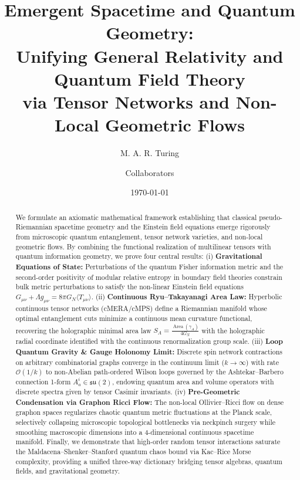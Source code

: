 \documentclass[11pt,a4paper,reqno]{amsart}
\title[Emergent Spacetime and Quantum Geometry]{Emergent Spacetime and Quantum Geometry:\\ Unifying General Relativity and Quantum Field Theory\\ via Tensor Networks and Non-Local Geometric Flows}
\author{M. A. R. Turing \and Collaborators}
\date{\today}
\theoremstyle{definition}
\numberwithin{equation}{section}
\newcommand{\Area}{\operatorname{Area}}
\begin{document}
\begin{abstract}
We formulate an axiomatic mathematical framework establishing that classical pseudo-Riemannian spacetime geometry and the Einstein field equations emerge rigorously from microscopic quantum entanglement, tensor network varieties, and non-local geometric flows. By combining the functional realization of multilinear tensors with quantum information geometry, we prove four central results:
(i) \textbf{Gravitational Equations of State:} Perturbations of the quantum Fisher information metric and the second-order positivity of modular relative entropy in boundary field theories constrain bulk metric perturbations to satisfy the non-linear Einstein field equations $G_{\mu\nu} + \Lambda g_{\mu\nu} = 8\pi G_N \langle T_{\mu\nu} \rangle$.
(ii) \textbf{Continuous Ryu--Takayanagi Area Law:} Hyperbolic continuous tensor networks (cMERA/cMPS) define a Riemannian manifold whose optimal entanglement cuts minimize a continuous mean curvature functional, recovering the holographic minimal area law $S_A = \frac{\Area(\gamma_A)}{4 G_N}$ with the holographic radial coordinate identified with the continuous renormalization group scale.
(iii) \textbf{Loop Quantum Gravity \& Gauge Holonomy Limit:} Discrete spin network contractions on arbitrary combinatorial graphs converge in the continuum limit ($k \to \infty$) with rate $\mathcal{O}(1/k)$ to non-Abelian path-ordered Wilson loops governed by the Ashtekar--Barbero connection 1-form $A_a^i \in \mathfrak{su}(2)$, endowing quantum area and volume operators with discrete spectra given by tensor Casimir invariants.
(iv) \textbf{Pre-Geometric Condensation via Graphon Ricci Flow:} The non-local Ollivier--Ricci flow on dense graphon spaces regularizes chaotic quantum metric fluctuations at the Planck scale, selectively collapsing microscopic topological bottlenecks via neckpinch surgery while smoothing macroscopic dimensions into a 4-dimensional continuous spacetime manifold.
Finally, we demonstrate that high-order random tensor interactions saturate the Maldacena--Shenker--Stanford quantum chaos bound via Kac--Rice Morse complexity, providing a unified three-way dictionary bridging tensor algebras, quantum fields, and gravitational geometry.
\end{abstract}

\maketitle

\tableofcontents
\end{document}
